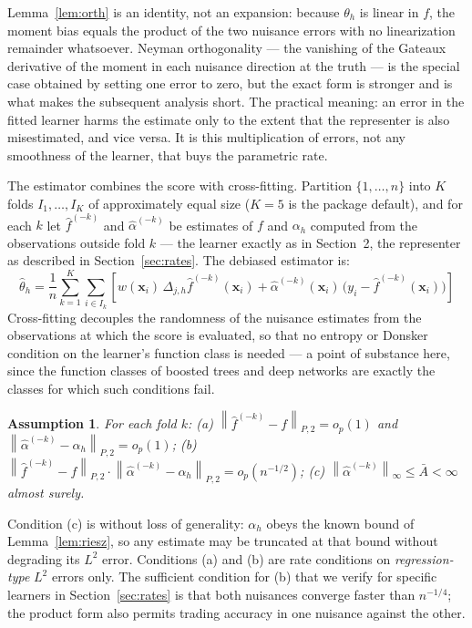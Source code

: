 \documentclass[12pt]{article}
\newtheorem{assumption}{Assumption}
\newcommand{\norm}[1]{\left\| #1 \right\|}
\newcommand{\Dh}{\Delta_{j,h}}
\newcommand{\Ptwo}[1]{\norm{#1}_{P,2}}
\begin{document}
	Lemma~\ref{lem:orth} is an identity, not an expansion: because $\theta_h$ is linear
	in $f$, the moment bias equals the product of the two nuisance errors with no
	linearization remainder whatsoever. Neyman orthogonality --- the vanishing of the
	Gateaux derivative of the moment in each nuisance direction at the truth
	\citep{chernozhukov2018dml} --- is the special case obtained by setting one error to
	zero, but the exact form is stronger and is what makes the subsequent analysis
	short. The practical meaning: an error in the fitted learner harms the estimate only
	to the extent that the representer is also misestimated, and vice versa. It is this
	multiplication of errors, not any smoothness of the learner, that buys the
	parametric rate.
	
	The estimator combines the score with cross-fitting. Partition
	$\{1, \dots, n\}$ into $K$ folds $I_1, \dots, I_K$ of approximately equal size
	($K = 5$ is the package default), and for each $k$ let
	$\hat{f}^{(-k)}$ and $\hat{\alpha}^{(-k)}$ be estimates of $f$ and $\alpha_h$
	computed from the observations outside fold $k$ --- the learner exactly as in
	Section~2, the representer as described in
	Section~\ref{sec:rates}. The debiased estimator is:
	\begin{equation}
		\hat{\theta}_h = \frac{1}{n} \sum_{k=1}^{K} \sum_{i \in I_k}
		\left[ w(\mathbf{x}_i)\, \Dh \hat{f}^{(-k)}(\mathbf{x}_i)
		+ \hat{\alpha}^{(-k)}(\mathbf{x}_i)\,
		\bigl(y_i - \hat{f}^{(-k)}(\mathbf{x}_i)\bigr) \right]
		\label{eq:dml}
	\end{equation}
	Cross-fitting decouples the randomness of the nuisance estimates from the
	observations at which the score is evaluated, so that no entropy or Donsker
	condition on the learner's function class is needed \citep{chernozhukov2018dml} ---
	a point of substance here, since the function classes of boosted trees and deep
	networks are exactly the classes for which such conditions fail.
	
	\begin{assumption}
		\label{ass:nuisance}
		For each fold $k$: (a)
		$\Ptwo{\hat{f}^{(-k)} - f} = o_p(1)$ and
		$\Ptwo{\hat{\alpha}^{(-k)} - \alpha_h} = o_p(1)$; (b)
		$\Ptwo{\hat{f}^{(-k)} - f} \cdot \Ptwo{\hat{\alpha}^{(-k)} - \alpha_h}
		= o_p(n^{-1/2})$; (c)
		$\norm{\hat{\alpha}^{(-k)}}_\infty \leq \bar{A} < \infty$ almost surely.
	\end{assumption}
	
	Condition (c) is without loss of generality: $\alpha_h$ obeys the known bound of
	Lemma~\ref{lem:riesz}, so any estimate may be truncated at that bound without
	degrading its $L^2$ error. Conditions (a) and (b) are rate conditions on
	\emph{regression-type} $L^2$ errors only. The sufficient condition for (b) that we
	verify for specific learners in Section~\ref{sec:rates} is that both nuisances
	converge faster than $n^{-1/4}$; the product form also permits trading accuracy in
	one nuisance against the other.
\end{document}
